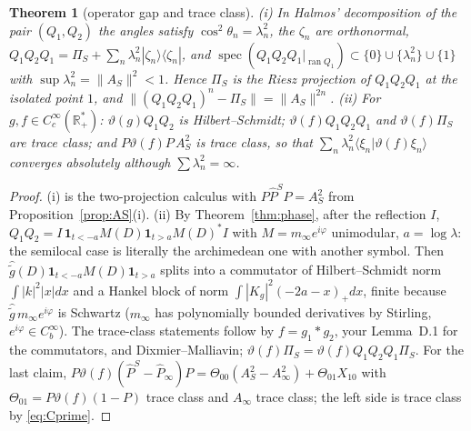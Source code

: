 \documentclass[11pt]{amsart}
\newtheorem{theorem}{Theorem}[section]
\theoremstyle{definition}
\theoremstyle{remark}
\newcommand{\R}{\mathbb R}
\newcommand{\ran}{\operatorname{ran}}
\newcommand{\Pih}{\widehat P}
\begin{document}
\begin{theorem}[operator gap and trace class]\label{thm:gap}
\emph{(i)} In Halmos' decomposition of the pair $(Q_1,Q_2)$ the angles satisfy $\cos^2\theta_n=\lambda_n^2$, the $\zeta_n$
are orthonormal, $Q_1Q_2Q_1=\Pi_S+\sum_n\lambda_n^2|\zeta_n\rangle\langle\zeta_n|$, and
$\operatorname{spec}(Q_1Q_2Q_1|_{\ran Q_1})\subset\{0\}\cup\{\lambda_n^2\}\cup\{1\}$ with $\sup\lambda_n^2=\|A_S\|^2<1$. Hence
$\Pi_S$ is the Riesz projection of $Q_1Q_2Q_1$ at the isolated point $1$, and
$\|(Q_1Q_2Q_1)^n-\Pi_S\|=\|A_S\|^{2n}$.
\emph{(ii)} For $g,f\in C_c^\infty(\R_+^*)$: $\vartheta(g)Q_1Q_2$ is Hilbert--Schmidt; $\vartheta(f)Q_1Q_2Q_1$ and
$\vartheta(f)\Pi_S$ are trace class; and $P\vartheta(f)P\,A_S^2$ is trace class, so that
$\sum_n\lambda_n^2\langle\xi_n|\vartheta(f)\xi_n\rangle$ converges absolutely although $\sum\lambda_n^2=\infty$.
\end{theorem}
\begin{proof}
(i) is the two-projection calculus \cite{Halmos1969} with $P\Pih^SP=A_S^2$ from Proposition~\ref{prop:AS}(i).
(ii) By Theorem~\ref{thm:phase}, after the reflection $I$, $Q_1Q_2=I\,\mathbf 1_{t<-a}M(D)\mathbf 1_{t>a}M(D)^*I$ with
$M=m_\infty e^{i\varphi}$ unimodular, $a=\log\lambda$: the semilocal case is literally the archimedean one with another
symbol. Then $\widehat{\tilde g}(D)\mathbf 1_{t<-a}M(D)\mathbf 1_{t>a}$ splits into a commutator of Hilbert--Schmidt norm
$\int|k|^2|x|dx$ and a Hankel block of norm $\int|K_g|^2(-2a-x)_+dx$, finite because $\widehat{\tilde g}\,m_\infty e^{i\varphi}$ is
Schwartz ($m_\infty$ has polynomially bounded derivatives by Stirling, $e^{i\varphi}\in C_b^\infty$). The trace-class
statements follow by $f=g_1*g_2$, your Lemma~D.1 for the commutators, and Dixmier--Malliavin;
$\vartheta(f)\Pi_S=\vartheta(f)Q_1Q_2Q_1\Pi_S$. For the last claim, $P\vartheta(f)(\Pih^S-\Pih_\infty)P=\Theta_{00}(A_S^2-A_\infty^2)+\Theta_{01}X_{10}$
with $\Theta_{01}=P\vartheta(f)(1-P)$ trace class and $A_\infty$ trace class; the left side is trace class by \eqref{eq:Cprime}.
\end{proof}
\end{document}
